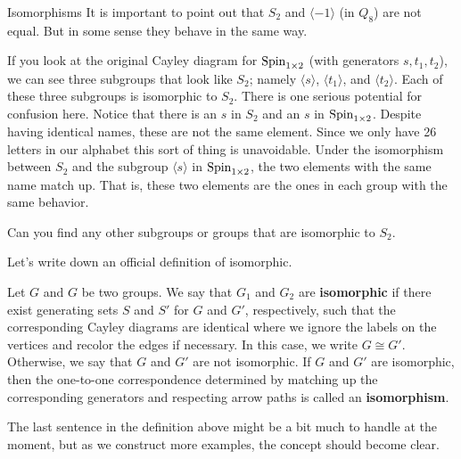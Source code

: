 \begin{section}{Isomorphisms}
It is important to point out that $S_2$ and $\langle -1\rangle$ (in $Q_8$) are not equal.  But in some sense they behave in the same way.

If you look at the original Cayley diagram for $\operatorname{Spin}_{1\times 2}$ (with generators $s, t_1, t_2$), we can see three subgroups that look like $S_2$; namely $\langle s\rangle$, $\langle t_1\rangle$, and $\langle t_2\rangle$.  Each of these three subgroups is isomorphic to $S_2$.  There is one serious potential for confusion here.  Notice that there is an $s$ in $S_2$ and an $s$ in $\operatorname{Spin}_{1\times 2}$.  Despite having identical names, these are not the same element.  Since we only have 26 letters in our alphabet this sort of thing is unavoidable.  Under the isomorphism between $S_2$ and the subgroup $\langle s\rangle$ in $\operatorname{Spin}_{1\times 2}$, the two elements with the same name match up.  That is, these two elements are the ones in each group with the same behavior.

\begin{exercise}
Can you find any other subgroups or groups that are isomorphic to $S_2$.
\end{exercise}

Let's write down an official definition of isomorphic.

\begin{definition}
Let $G$ and $G$ be two groups.  We say that $G_1$ and $G_2$ are \textbf{isomorphic} if there exist generating sets $S$ and $S'$ for $G$ and $G'$, respectively, such that the corresponding Cayley diagrams are identical where we ignore the labels on the vertices and recolor the edges if necessary.  In this case, we write $G\cong G'$.  Otherwise, we say that $G$ and $G'$ are not isomorphic.  If $G$ and $G'$ are isomorphic, then the one-to-one correspondence determined by matching up the corresponding generators and respecting arrow paths is called an \textbf{isomorphism}.
\end{definition}

The last sentence in the definition above might be a bit much to handle at the moment, but as we construct more examples, the concept should become clear.  


\end{section}
